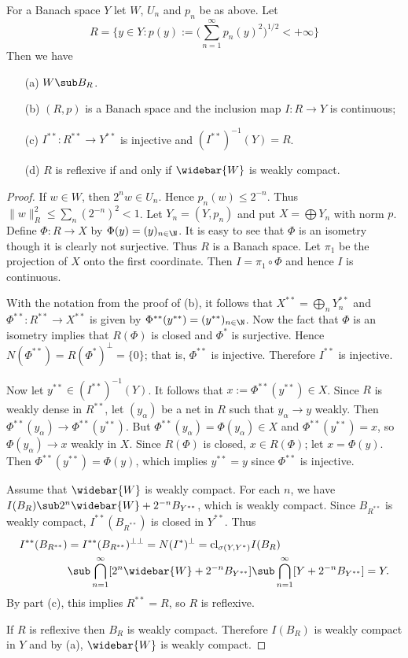 \begin{lemma}\label{Banach space weakly compact operator lemma}
For a Banach space $Y$ let $W$, $U_n$ and $p_n$ be as above. Let 
\[R=\{y\in Y:p(y):=\Big(\sum_{n=1}^{\infty}p_n(y)^2\Big)^{1/2}<+\infty\}\]
Then we have
\begin{itemize}
\item[(a)] $W\sub B_R$.
\item[(b)] $(R,p)$ is a Banach space and the inclusion map $I:R\to Y$ is continuous;
\item[(c)] $I^{**}:R^{**}\to Y^{**}$ is injective and $(I^{**})^{-1}(Y)=R$.
\item[(d)] $R$ is reflexive if and only if $\widebar{W}$ is weakly compact. 
\end{itemize}
\end{lemma}
\begin{proof}
If $w\in W$, then $2^nw\in U_n$. Hence $p_n(w)\leq 2^{-n}$. Thus $\|w\|^2_R\leq\sum_n(2^{-n})^2<1$. Let $Y_n=(Y,p_n)$ and put $X=\bigoplus Y_n$ with norm $p$. Define $\Phi:R\to X$ by $\Phi(y)=(y)_{n\in\N}$. It is easy to see that $\Phi$ is an isometry though it is clearly not surjective. Thus $R$ is a Banach space. Let $\pi_1$ be the projection of $X$ onto the first coordinate. Then $I=\pi_1\circ\Phi$ and hence $I$ is continuous.\par
With the notation from the proof of (b), it follows that $X^{**}=\bigoplus_nY_n^{**}$ and $\Phi^{**}:R^{**}\to X^{**}$ is given by $\Phi^{**}(y^{**})=(y^{**})_{n\in\N}$. Now the fact that $\Phi$ is an isometry implies that $R(\Phi)$ is closed and $\Phi^*$ is surjective. Hence $N(\Phi^{**})=R(\Phi^*)^\bot=\{0\}$; that is, $\Phi^{**}$ is injective. Therefore $I^{**}$ is injective.\par
Now let $y^{**}\in (I^{**})^{-1}(Y)$. It follows that $x:=\Phi^{**}(y^{**})\in X$. Since $R$ is weakly dense in $R^{**}$, let $(y_\alpha)$ be a net in $R$ such that $y_\alpha\to y$ weakly. Then $\Phi^{**}(y_\alpha)\to\Phi^{**}(y^{**})$. But $\Phi^{**}(y_\alpha)=\Phi(y_\alpha)\in X$ and $\Phi^{**}(y^{**})=x$, so $\Phi(y_\alpha)\to x$ weakly in $X$. Since $R(\Phi)$ is closed, $x\in R(\Phi)$; let $x=\Phi(y)$. Then $\Phi^{**}(y^{**})=\Phi(y)$, which implies $y^{**}=y$ since $\Phi^{**}$ is injective.\par
Assume that $\widebar{W}$ is weakly compact. For each $n$, we have $I(B_{R})\sub 2^n\widebar{W}+2^{-n}B_{Y^{**}}$, which is weakly compact. Since $B_{R^{**}}$ is weakly compact, $I^{**}(B_{R^{**}})$ is closed in $Y^{**}$. Thus
\begin{align*}
I^{**}(B_{R^{**}})&=I^{**}(B_{R^{**}})^{\bot\bot}=N(I^*)^\bot=\mathrm{cl}_{\sigma(Y,Y^*)}I(B_R)\\
&\sub \bigcap_{n=1}^{\infty}[2^n\widebar{W}+2^{-n}B_{Y^{**}}]\sub\bigcap_{n=1}^{\infty}[Y+2^{-n}B_{Y^{**}}]=Y.
\end{align*}
By part (c), this implies $R^{**}=R$, so $R$ is reflexive.\par
If $R$ is reflexive then $B_{R}$ is weakly compact. Therefore $I(B_R)$ is weakly compact in $Y$ and by (a), $\widebar{W}$ is weakly compact.
\end{proof}

